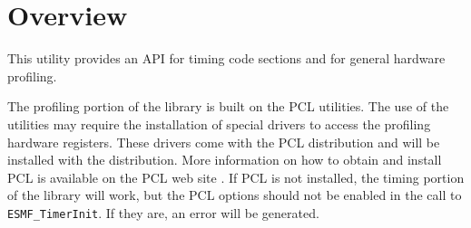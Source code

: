 \section{Overview}

This utility provides an API for timing code sections and
for general hardware profiling.

The profiling portion of the library is built on the PCL \cite{pcl} utilities.
The use of the utilities may require the installation of special drivers to access
the profiling hardware registers.  These drivers come with the PCL distribution and
will be installed with the distribution.  More information on how to obtain and install
PCL is available on the PCL web site 
.
If PCL is not installed, the timing portion of the library will work, but the PCL options should not
be enabled in the call to {\tt ESMF\_TimerInit}.  If they are, an error will be generated.

